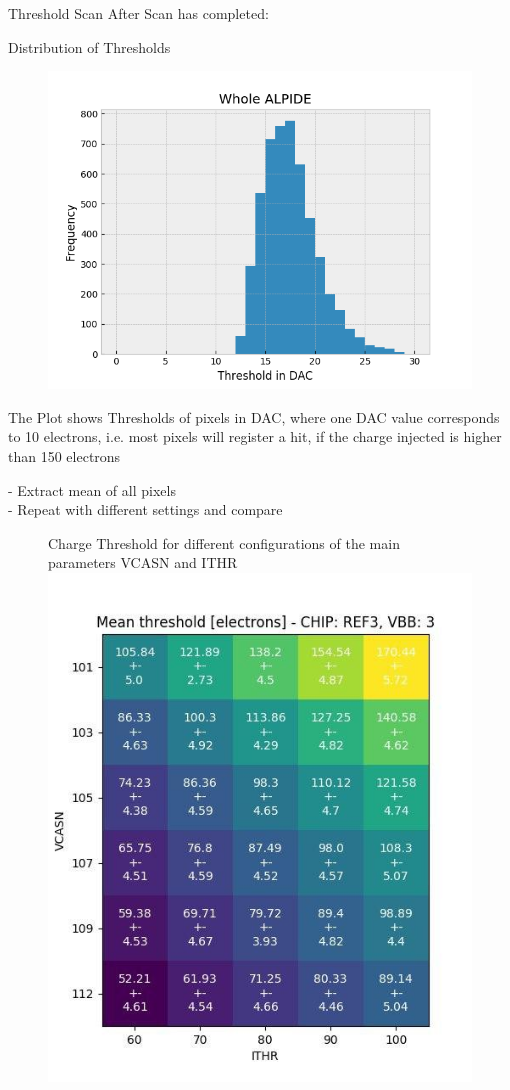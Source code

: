 \documentclass{beamer}
\begin{document}
\begin{frame}{Threshold Scan}
    After Scan has completed: \\
    \begin{minipage}{.49\textwidth}
	Distribution of Thresholds
    \begin{figure}[H]
       \centering
       \includegraphics[trim=0 0 0 40,clip,width=.9\textwidth]{landau.png}
    \end{figure} 
	\tiny The Plot shows Thresholds of pixels in DAC, where one
	DAC value corresponds to 10 electrons, i.e. most pixels will register
	a hit, if the charge injected is higher than 150 electrons
    \end{minipage}
    \begin{minipage}{.49\textwidth}
	\scriptsize{- Extract mean of all pixels}\\
	\pause
	- Repeat with different settings and compare
	\begin{figure}[H]
	    \centering
	    \tiny Charge Threshold for different configurations of the main
	    parameters VCASN and ITHR\\
	    \includegraphics[trim=0 0 0 50, clip, width=.7\textwidth]{thresholdmap.jpg}

\end{figure}
\end{minipage}
\end{frame}
\end{document}
